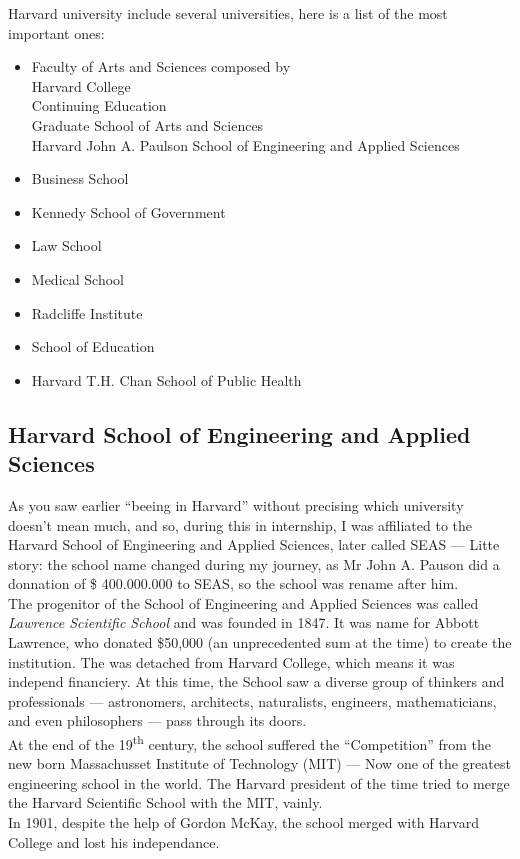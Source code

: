 \documentclass[10pt,a4paper]{article}
\begin{document}
Harvard university include several universities, here is a list of the most important ones:\\
\begin{itemize}
  \item Faculty of Arts and Sciences composed by \\Harvard College \\Continuing Education \\Graduate School of Arts and Sciences \\Harvard John A. Paulson School of Engineering and Applied Sciences
\item Business School
\item Kennedy School of Government
\item Law School
\item Medical School
\item Radcliffe Institute
\item School of Education
\item Harvard T.H. Chan School of Public Health
\end{itemize}


\subsection{Harvard School of Engineering and Applied Sciences}
As you saw earlier ``beeing in Harvard'' without precising which university doesn't mean much, and so, during this in internship, I was affiliated to the Harvard School of Engineering and Applied Sciences, later called SEAS — Litte story: the school name changed during my journey, as Mr John A. Pauson did a donnation of \$ 400.000.000 to SEAS, so the school was rename after him.\\

The progenitor of the School of Engineering and Applied Sciences was called \textit{Lawrence Scientific School} and was founded in 1847. It was name for Abbott Lawrence, who donated \$50,000 (an unprecedented sum at the time) to create the institution. The was detached from Harvard College, which means it was independ financiery.
At this time, the School saw a diverse group of thinkers and professionals — astronomers, architects, naturalists, engineers, mathematicians, and even philosophers — pass through its doors.\\
At the end of the 19\textsuperscript{th} century, the school suffered the ``Competition'' from the new born Massachusset Institute of Technology (MIT) — Now one of the greatest engineering school in the world. The Harvard president of the time tried to merge the Harvard Scientific School with the MIT, vainly.\\
In 1901, despite the help of Gordon McKay, the school merged with Harvard College and lost his independance.\\
\end{document}
